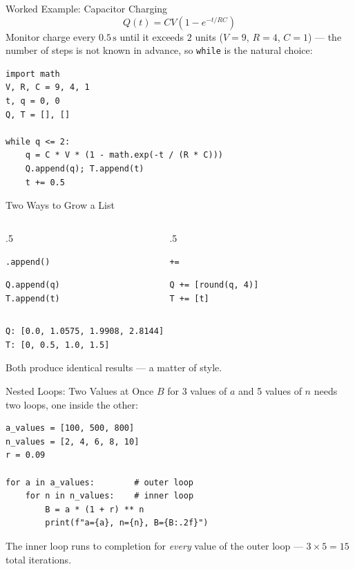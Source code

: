 \documentclass[9pt,aspectratio=169,xcolor=table]{beamer}
\begin{document}
\begin{frame}[fragile]{Worked Example: Capacitor Charging}
    \leavevmode
    \[
    Q(t) = CV\left(1 - e^{-t/RC}\right)
    \]
    Monitor charge every $0.5\,\text{s}$ until it exceeds $2$ units
    ($V=9$, $R=4$, $C=1$) --- the number of steps is \alert{not known
    in advance}, so \texttt{while} is the natural choice:

\begin{lstlisting}
import math
V, R, C = 9, 4, 1
t, q = 0, 0
Q, T = [], []

while q <= 2:
    q = C * V * (1 - math.exp(-t / (R * C)))
    Q.append(q); T.append(t)
    t += 0.5
\end{lstlisting}
\end{frame}

\begin{frame}[fragile]{Two Ways to Grow a List}
    \leavevmode
    \begin{columns}[t]
        \begin{column}{.5\textwidth}
            \begin{block}{\texttt{.append()}}
\begin{lstlisting}
Q.append(q)
T.append(t)
\end{lstlisting}
            \end{block}
        \end{column}
        \begin{column}{.5\textwidth}
            \begin{block}{\texttt{+=}}
\begin{lstlisting}
Q += [round(q, 4)]
T += [t]
\end{lstlisting}
            \end{block}
        \end{column}
    \end{columns}

    \vspace{3mm}
\begin{lstlisting}[style=skoutput]
Q: [0.0, 1.0575, 1.9908, 2.8144]
T: [0, 0.5, 1.0, 1.5]
\end{lstlisting}

    \vspace{1mm}
    {\small Both produce identical results --- a matter of style.}
\end{frame}

\begin{frame}[fragile]{Nested Loops: Two Values at Once}
    \leavevmode
    $B$ for 3 values of $a$ \alert{and} 5 values of $n$ needs \alert{two}
    loops, one inside the other:

\begin{lstlisting}
a_values = [100, 500, 800]
n_values = [2, 4, 6, 8, 10]
r = 0.09

for a in a_values:        # outer loop
    for n in n_values:    # inner loop
        B = a * (1 + r) ** n
        print(f"a={a}, n={n}, B={B:.2f}")
\end{lstlisting}

    \vspace{1mm}
    {\small The inner loop runs to completion for \emph{every} value of
    the outer loop --- $3 \times 5 = 15$ total iterations.}
\end{frame}
\end{document}
